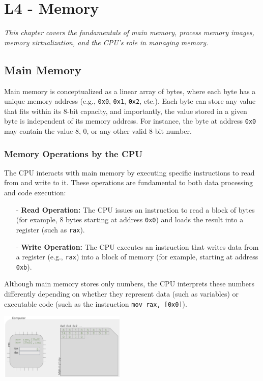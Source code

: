 \documentclass[../../compsys.tex]{subfiles}
\begin{document}
\chapter{L4 - Memory}
\textit{This chapter covers the fundamentals of main memory, process memory images, memory virtualization, and the CPU's role in managing memory.}
\vspace{15px}
\section{Main Memory}
Main memory is conceptualized as a linear array of bytes, where each byte has a unique memory address (e.g., \texttt{0x0}, \texttt{0x1}, \texttt{0x2}, etc.). Each byte can store any value that fits within its 8-bit capacity, and importantly, the value stored in a given byte is independent of its memory address. For instance, the byte at address \texttt{0x0} may contain the value 8, 0, or any other valid 8-bit number.

\subsection{Memory Operations by the CPU}
The CPU interacts with main memory by executing specific instructions to read from and write to it. These operations are fundamental to both data processing and code execution:

\begin{itemize}
  \item[-] \textbf{Read Operation:} The CPU issues an instruction to read a block of bytes (for example, 8 bytes starting at address \texttt{0x0}) and loads the result into a register (such as \texttt{rax}).
  \item[-] \textbf{Write Operation:} The CPU executes an instruction that writes data from a register (e.g., \texttt{rax}) into a block of memory (for example, starting at address \texttt{0xb}).
\end{itemize}

Although main memory stores only numbers, the CPU interprets these numbers differently depending on whether they represent data (such as variables) or executable code (such as the instruction \texttt{mov rax, [0x0]}).

\begin{center}
  \includegraphics[width=0.45\textwidth]{chapters/L4/images/main-mem.png}
\end{center}
\newpage
\end{document}
